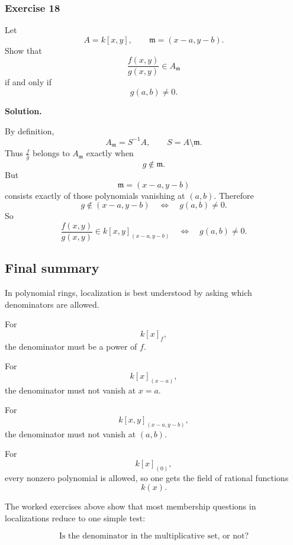 \documentclass[12pt,a4paper]{article}
\theoremstyle{notespace}
\theoremstyle{definition}
\begin{document}
\subsubsection{Exercise 18}

Let
\[
A=k[x,y],
\qquad
\mathfrak m=(x-a,y-b).
\]
Show that
\[
\frac{f(x,y)}{g(x,y)}\in A_{\mathfrak m}
\]
if and only if
\[
g(a,b)\neq 0.
\]

\textbf{Solution.}

By definition,
\[
A_{\mathfrak m}=S^{-1}A,
\qquad
S=A\setminus \mathfrak m.
\]
Thus \(\frac{f}{g}\) belongs to \(A_{\mathfrak m}\) exactly when
\[
g\notin \mathfrak m.
\]
But
\[
\mathfrak m=(x-a,y-b)
\]
consists exactly of those polynomials vanishing at \((a,b)\). Therefore
\[
g\notin (x-a,y-b)
\quad\Longleftrightarrow\quad
g(a,b)\neq 0.
\]
So
\[
\frac{f(x,y)}{g(x,y)}\in k[x,y]_{(x-a,y-b)}
\quad\Longleftrightarrow\quad
g(a,b)\neq 0.
\]

\subsection{Final summary}

In polynomial rings, localization is best understood by asking which denominators are allowed.

For
\[
k[x]_f,
\]
the denominator must be a power of \(f\).

For
\[
k[x]_{(x-a)},
\]
the denominator must not vanish at \(x=a\).

For
\[
k[x,y]_{(x-a,y-b)},
\]
the denominator must not vanish at \((a,b)\).

For
\[
k[x]_{(0)},
\]
every nonzero polynomial is allowed, so one gets the field of rational functions
\[
k(x).
\]

The worked exercises above show that most membership questions in localizations reduce to one simple test:

\[
\text{Is the denominator in the multiplicative set, or not?}
\]
\end{document}
